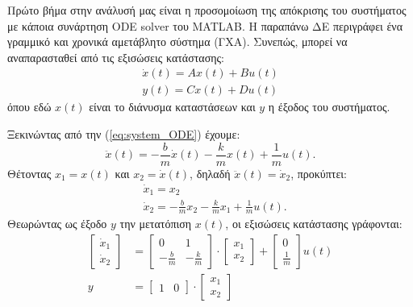 \documentclass[a4paper,12pt]{article}
\begin{document}
Πρώτο βήμα στην ανάλυσή μας είναι η προσομοίωση της απόκρισης του συστήματος με κάποια συνάρτηση 
ODE solver του 
MATLAB. Η παραπάνω ΔΕ περιγράφει ένα γραμμικό και χρονικά 
αμετάβλητο σύστημα (ΓΧΑ). Συνεπώς, μπορεί να αναπαρασταθεί από τις εξισώσεις κατάστασης:
\begin{equation}
\begin{aligned}
    \dot{x}(t) = A x(t) + B u(t) \\
    y(t) = C x(t) + D u(t)
\end{aligned}
\label{eq:state_space_equations}
\end{equation}
όπου εδώ $x(t)$ είναι το διάνυσμα καταστάσεων και $y$ η έξοδος του συστήματος.

Ξεκινώντας από την (\ref{eq:system_ODE}) έχουμε:
\begin{equation}
    \ddot{x}(t) = -\frac{b}{m} \dot{x}(t) -\frac{k}{m} x(t) + \frac{1}{m} u(t).
    \label{eq:system_ODE_2}
\end{equation}
Θέτοντας $x_1 = x(t)$ και $x_2 = \dot{x}(t)$, δηλαδή $\ddot{x}(t) = \dot{x}_2$, προκύπτει:
\begin{equation*}
\begin{aligned}
    &\dot{x}_1 = x_2 \\
    &\dot{x}_2 = -\frac{b}{m} x_2 -\frac{k}{m} x_1 + \frac{1}{m} u(t).
\end{aligned}
\end{equation*}
Θεωρώντας ως έξοδο $y$ την μετατόπιση $x(t)$, οι εξισώσεις κατάστασης γράφονται:
\begin{equation*}
\begin{aligned}
    \begin{bmatrix}
        \dot{x}_1 \\
        \dot{x}_2
    \end{bmatrix} &= 
    \begin{bmatrix}
        0 & 1 \\
        -\frac{b}{m} & -\frac{k}{m}
    \end{bmatrix} \cdot
    \begin{bmatrix}
        x_1 \\
        x_2
    \end{bmatrix} +
    \begin{bmatrix}
        0 \\
        \frac{1}{m}
    \end{bmatrix} u(t) \\
    y &= 
    \begin{bmatrix}
        1 & 0
    \end{bmatrix} \cdot
    \begin{bmatrix}
        x_1 \\
        x_2
    \end{bmatrix}
\end{aligned}
\end{equation*}
\end{document}
